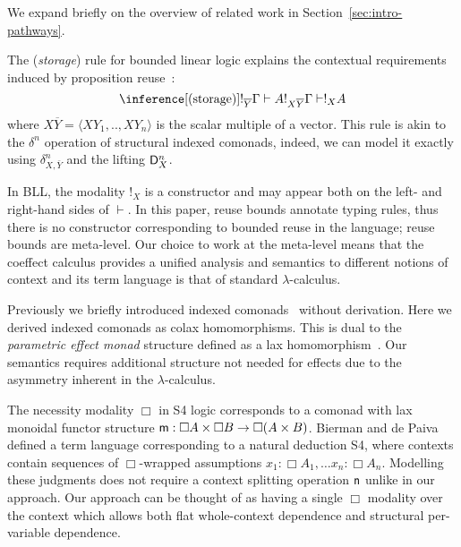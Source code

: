 We expand briefly on the overview of related work in 
Section~\ref{sec:intro-pathways}.

The (\emph{storage}) rule for bounded linear logic explains the contextual requirements 
induced by proposition reuse~\cite{girard1992bounded}:
$$
\inference[\text{(storage)}]{!_{\overline{Y}} \Gamma \vdash A}{!_{X\overline{Y}} \Gamma \vdash !_X A} 
$$
where $X\overline{Y} = \langle{XY_1, .., XY_n}\rangle$ is the scalar multiple of a vector. 
This rule is akin to the $\delta^n$ operation of structural indexed comonads,
indeed, we can model it exactly using $\delta^{n}_{X,\bar{Y}}$ and the lifting $\mathsf{D}^n_X$.

In BLL, the modality $!_X$ is a constructor and may 
  appear both on the left- and right-hand sides of $\vdash$.
  In this paper, reuse bounds 
  annotate typing rules, thus there is no constructor
  corresponding to bounded reuse in the language; reuse bounds are
  meta-level. Our choice to work at the meta-level means that the 
  coeffect calculus provides a unified analysis and semantics to
  different notions of context and its term language is that of standard $\lambda$-calculus.

Previously we briefly introduced indexed comonads~\cite{petricek2013coeffects}
without derivation.  Here we derived indexed comonads as colax
homomorphisms. This is dual to the \emph{parametric effect monad}
structure defined as a lax
homomorphism~\cite{katsumata2014parametric}. Our semantics 
requires additional structure not needed for effects due to the
asymmetry inherent in the $\lambda$-calculus.

The necessity modality $\Box$ in S4 logic corresponds to a comonad
with lax monoidal functor structure $\mathsf{m} : \Box A \times \Box B \rightarrow \Box (A \times B)$. 
Bierman and de Paiva \cite{bierman2000intuitionistic} defined a term language corresponding to a natural deduction S4, where contexts contain sequences of $\Box$-wrapped assumptions
$x_1 \!:\! \Box A_1, \ldots x_n \!:\! \Box A_n$. Modelling these judgments does not require a context splitting operation $\mathsf{n}$ 
unlike in our approach. Our approach can be thought of as having a single $\Box$ modality over the context 
which allows both flat whole-context dependence and structural per-variable dependence.

